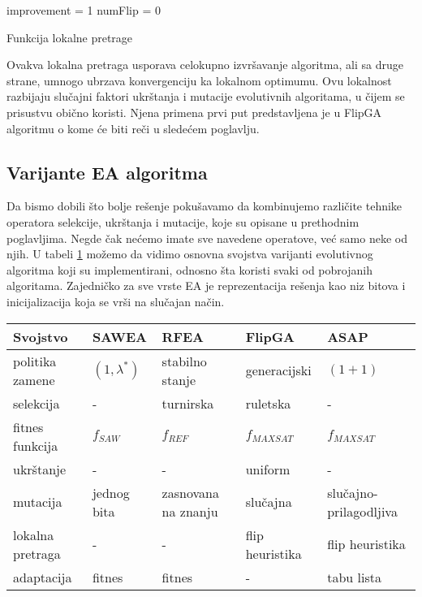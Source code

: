 \documentclass{article}
\begin{document}

\begin{algorithm}[H]
\SetAlgoLined
{}

\BlankLine
 improvement = 1\;
 numFlip = 0\;
 \caption{Funkcija lokalne pretrage}
\end{algorithm}

Ovakva lokalna pretraga usporava celokupno izvršavanje algoritma, ali sa druge strane, 
umnogo ubrzava konvergenciju ka lokalnom optimumu. Ovu lokalnost razbijaju slučajni faktori
ukrštanja i mutacije evolutivnih algoritama, u čijem se prisustvu obično koristi. 
Njena primena prvi put predstavljena je u FlipGA algoritmu o kome će biti reči u sledećem poglavlju.


\subsection{Varijante EA algoritma}
\label{sec:ea_varijante}
Da bismo dobili što bolje rešenje pokušavamo da kombinujemo različite tehnike 
operatora selekcije, ukrštanja i mutacije, koje su opisane u prethodnim poglavljima. 
Negde čak nećemo imate sve navedene operatove, već samo neke od njih. 
U tabeli \ref{tab:EA} možemo da vidimo osnovna svojstva varijanti evolutivnog algoritma 
koji su implementirani, odnosno šta koristi svaki od pobrojanih algoritama.
Zajedničko za sve vrste EA je reprezentacija rešenja kao niz bitova i
inicijalizacija koja se vrši na slučajan način.\\
 
\begin{table}[h!]
\centering
{}\label{tab:EA} 
\begin{tabular}{ |p{2.8cm}|p{2.3cm}|p{2.3cm}|p{2.3cm}|p{2.3cm}|}
 \hline
 Svojstvo & SAWEA & RFEA & FlipGA & ASAP \\
 \hline
 politika zamene & $(1, \lambda^*)$ & stabilno stanje & generacijski & $(1 + 1)$ \\
 selekcija & - & turnirska & ruletska & - \\
 fitnes funkcija &	$f_{SAW}$ & $f_{REF}$ & $f_{MAXSAT}$ & $f_{MAXSAT}$ \\
 ukrštanje & - & - & uniform & - \\
 mutacija & jednog bita & zasnovana na znanju & slučajna & slučajno-prilagodljiva \\
 lokalna pretraga & - & - & flip heuristika & flip heuristika \\
 adaptacija & fitnes & fitnes &  - & tabu lista \\
 \hline
\end{tabular}
\end{table}
\end{document}

